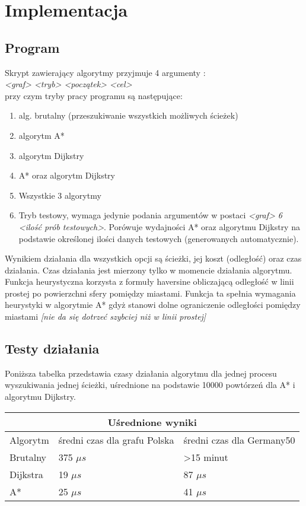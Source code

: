 \documentclass[11pt]{article} %
\begin{document}
\section{Implementacja}
\subsection{Program}
Skrypt zawierający algorytmy przyjmuje 4 argumenty : \\ 
\textsl{<graf> <tryb> <początek> <cel>}\\
przy czym tryby pracy programu są następujące:
\begin{enumerate}
\item
alg. brutalny (przeszukiwanie wszystkich możliwych ścieżek)
\item
algorytm A* 
\item
algorytm Dijkstry
\item
A* oraz algorytm Dijkstry
\item
Wszystkie 3 algorytmy
\item
Tryb testowy, wymaga jedynie podania argumentów w postaci \textsl{<graf> 6 <ilość prób testowych>}. Porówuje wydajności A* oraz algorytmu Dijkstry na podstawie określonej ilości danych testowych (generowanych automatycznie).
\end{enumerate}
Wynikiem działania dla wszystkich opcji są ścieżki, jej koszt (odległość) oraz czas działania. Czas działania jest mierzony tylko w momencie działania algorytmu. Funkcja heurystyczna korzysta z formuły haversine obliczającą odległość w linii prostej po powierzchni sfery pomiędzy miastami. Funkcja ta spełnia wymagania heurystyki w algorytmie A* gdyż stanowi dolne ograniczenie odległości pomiędzy miastami \textsl{[nie da się dotrzeć szybciej niż w linii prostej]}
\subsection{Testy działania}
Poniższa tabelka przedstawia czasy działania algorytmu dla jednej procesu wyszukiwania jednej ścieżki, uśrednione na podstawie 10000 powtórzeń dla A* i algorytmu Dijkstry.
\begin{table}[h!]
\centering
\begin{tabular}{ ||p{3cm}||p{5cm}|p{5cm}||  }
\hline
\multicolumn{3}{|c|}{Uśrednione wyniki} \\
\hline
Algorytm & średni czas dla grafu Polska & średni czas dla Germany50 \\
\hline
Brutalny &375 $\mu s$ &>15 minut \\
Dijkstra &19 $\mu s$ &87 $\mu s$ \\
A* &25 $\mu s$ &41 $\mu s$ \\
\hline
\end{tabular}
\end{table}
\end{document}
